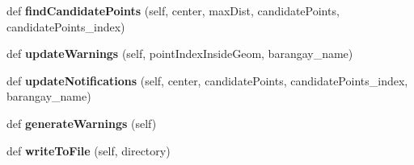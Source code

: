 \begin{DoxyCompactItemize}
\item 
\hypertarget{classsurgewarnings_1_1_warnings_1_1_warnings_a549fb4e600e433bf83a4229e6232e03b}{}def {\bfseries find\+Candidate\+Points} (self, center, max\+Dist, candidate\+Points, candidate\+Points\+\_\+index)\label{classsurgewarnings_1_1_warnings_1_1_warnings_a549fb4e600e433bf83a4229e6232e03b}

\item 
\hypertarget{classsurgewarnings_1_1_warnings_1_1_warnings_acb7668a15b56d3cbed84d3f5635f1598}{}def {\bfseries update\+Warnings} (self, point\+Index\+Inside\+Geom, barangay\+\_\+name)\label{classsurgewarnings_1_1_warnings_1_1_warnings_acb7668a15b56d3cbed84d3f5635f1598}

\item 
\hypertarget{classsurgewarnings_1_1_warnings_1_1_warnings_a1f0ca89dac61d10e5b015da7335ff8ab}{}def {\bfseries update\+Notifications} (self, center, candidate\+Points, candidate\+Points\+\_\+index, barangay\+\_\+name)\label{classsurgewarnings_1_1_warnings_1_1_warnings_a1f0ca89dac61d10e5b015da7335ff8ab}

\item 
\hypertarget{classsurgewarnings_1_1_warnings_1_1_warnings_aba3098988584f1befb21d8f63fd93879}{}def {\bfseries generate\+Warnings} (self)\label{classsurgewarnings_1_1_warnings_1_1_warnings_aba3098988584f1befb21d8f63fd93879}

\item 
\hypertarget{classsurgewarnings_1_1_warnings_1_1_warnings_a3d93391aa02f542a65dcec9897bba2ed}{}def {\bfseries write\+To\+File} (self, directory)\label{classsurgewarnings_1_1_warnings_1_1_warnings_a3d93391aa02f542a65dcec9897bba2ed}

\end{DoxyCompactItemize}
